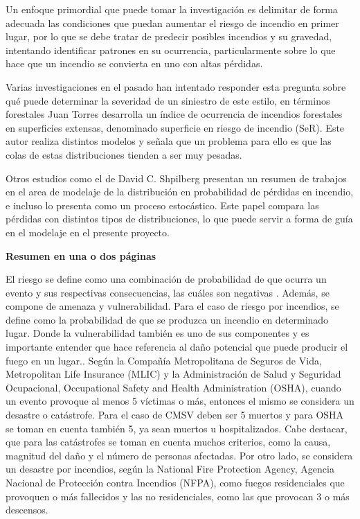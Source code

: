 \documentclass[
  oneside]{memoir}
\begin{document}
Un enfoque primordial que puede tomar la investigación es delimitar de
forma adecuada las condiciones que puedan aumentar el riesgo de incendio
en primer lugar, por lo que se debe tratar de predecir posibles
incendios y su gravedad, intentando identificar patrones en su
ocurrencia, particularmente sobre lo que hace que un incendio se
convierta en uno con altas pérdidas.

Varias investigaciones en el pasado han intentado responder esta
pregunta sobre qué puede determinar la severidad de un siniestro de este
estilo, en términos forestales Juan Torres \citep{rojo} desarrolla un
índice de ocurrencia de incendios forestales en superficies extensas,
denominado superficie en riesgo de incendio (SeR). Este autor realiza
distintos modelos y señala que un problema para ello es que las colas de
estas distribuciones tienden a ser muy pesadas.

Otros estudios como el de David C. Shpilberg \citep{shpilberg} presentan
un resumen de trabajos en el area de modelaje de la distribución en
probabilidad de pérdidas en incendio, e incluso lo presenta como un
proceso estocástico. Este papel compara las pérdidas con distintos tipos
de distribuciones, lo que puede servir a forma de guía en el modelaje en
el presente proyecto.

\textbf{Resumen en una o dos páginas}

El riesgo se define como una combinación de probabilidad de que ocurra
un evento y sus respectivas consecuencias, las cuáles son negativas
\citep{ciifen}. Además, se compone de amenaza y vulnerabilidad. Para el
caso de riesgo por incendios, se define como la probabilidad de que se
produzca un incendio en determinado lugar. Donde la vulnerabilidad
también es uno de sus componentes y es importante entender que hace
referencia al daño potencial que puede producir el fuego en un
lugar.\citep{cartografia}. Según la Compañía Metropolitana de Seguros de
Vida, Metropolitan Life Insurance (MLIC) y la Administración de Salud y
Seguridad Ocupacional, Occupational Safety and Health Administration
(OSHA), cuando un evento provoque al menos 5 víctimas o más, entonces el
mismo se considera un desastre o catástrofe. Para el caso de CMSV deben
ser 5 muertos y para OSHA se toman en cuenta también 5, ya sean muertos
u hospitalizados. Cabe destacar, que para las catástrofes se toman en
cuenta muchos criterios, como la causa, magnitud del daño y el número de
personas afectadas. Por otro lado, se considera un desastre por
incendios, según la National Fire Protection Agency, Agencia Nacional de
Protección contra Incendios (NFPA), como fuegos residenciales que
provoquen o más fallecidos y las no residenciales, como las que provocan
3 o más descensos.
\end{document}
